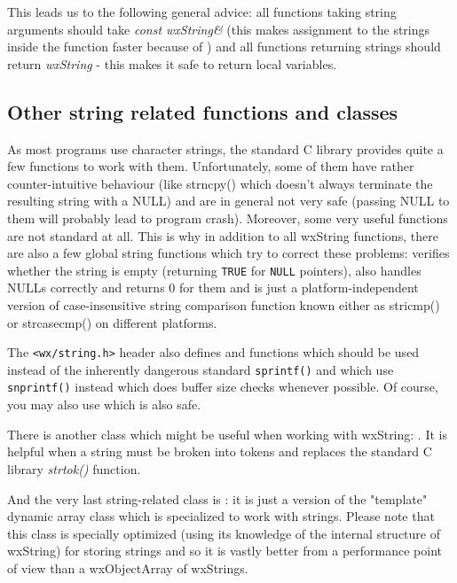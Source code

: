 This leads us to the following general advice: all functions taking string
arguments should take {\it const wxString\&} (this makes assignment to the
strings inside the function faster because of 
) and all functions returning
strings should return {\it wxString} - this makes it safe to return local
variables.

\subsection{Other string related functions and classes}

As most programs use character strings, the standard C library provides quite
a few functions to work with them. Unfortunately, some of them have rather
counter-intuitive behaviour (like strncpy() which doesn't always terminate the
resulting string with a NULL) and are in general not very safe (passing NULL
to them will probably lead to program crash). Moreover, some very useful
functions are not standard at all. This is why in addition to all wxString
functions, there are also a few global string functions which try to correct
these problems:  verifies whether the string
is empty (returning {\tt TRUE} for {\tt NULL} pointers), 
 also handles NULLs correctly and returns 0 for
them and  is just a platform-independent
version of case-insensitive string comparison function known either as
stricmp() or strcasecmp() on different platforms.

The {\tt <wx/string.h>} header also defines  
and  functions which should be used instead
of the inherently dangerous standard {\tt sprintf()} and which use {\tt
snprintf()} instead which does buffer size checks whenever possible. Of
course, you may also use  which is
also safe.

There is another class which might be useful when working with wxString: 
. It is helpful when a string must
be broken into tokens and replaces the standard C library {\it
strtok()} function.

And the very last string-related class is : it
is just a version of the "template" dynamic array class which is specialized to work
with strings. Please note that this class is specially optimized (using its
knowledge of the internal structure of wxString) for storing strings and so it is
vastly better from a performance point of view than a wxObjectArray of wxStrings.

